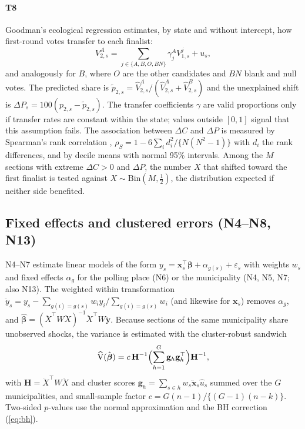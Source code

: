 \paragraph{T8} Goodman's ecological regression \cite{goodman1953}
estimates, by state and without intercept, how first-round votes transfer to
each finalist:
\begin{equation}
V^{A}_{2,s}=\sum_{j\in\{A,B,O,\mathit{BN}\}}\gamma^{A}_{j}V_{1,s}^{j}+u_s,
\label{eq:goodman}
\end{equation}
and analogously for $B$, where $O$ are the other candidates and
$\mathit{BN}$ blank and null votes. The predicted share is
$\tilde p_{2,s}=\hat V^A_{2,s}/(\hat V^A_{2,s}+\hat V^B_{2,s})$ and the
unexplained shift is $\Delta P_s=100(p_{2,s}-\tilde p_{2,s})$. The
transfer coefficients $\gamma$ are valid proportions only if transfer rates
are constant within the state; values outside $[0,1]$ signal that this
assumption fails. The association between $\Delta C$ and $\Delta P$ is
measured by Spearman's rank correlation \cite{spearman1904},
$\rho_S=1-6\sum_i d_i^2/\{N(N^2-1)\}$ with $d_i$ the rank differences, and by
decile means with normal 95\% intervals. Among the $M$ sections with extreme
$\Delta C>0$ and $\Delta P$, the number $X$ that shifted toward the first
finalist is tested against $X\sim\mathrm{Bin}(M,\tfrac12)$, the distribution
expected if neither side benefited.

\subsection{Fixed effects and clustered errors (N4--N8, N13)}

N4--N7 estimate linear models of the form $y_s=\mathbf x_s^\top\boldsymbol\beta+\alpha_{g(s)}+\varepsilon_s$
with weights $w_s$ and fixed effects $\alpha_g$ for the polling place (N6)
or the municipality (N4, N5, N7; also N13). The weighted within transformation
$\ddot y_s=y_s-\sum_{g(i)=g(s)}w_iy_i/\sum_{g(i)=g(s)}w_i$ (and likewise for
$\mathbf x_s$) removes $\alpha_g$, and
$\hat{\boldsymbol\beta}=(\ddot X^\top W\ddot X)^{-1}\ddot X^\top W\ddot{\mathbf y}$.
Because sections of the same municipality share unobserved shocks, the
variance is estimated with the cluster-robust sandwich \cite{cameron2015}
\begin{equation}
\widehat{\mathrm V}(\hat{\boldsymbol\beta})=c\,\mathbf H^{-1}
\Bigl(\sum_{h=1}^{G}\mathbf g_h\mathbf g_h^\top\Bigr)\mathbf H^{-1},
\label{eq:sandwich}
\end{equation}
with $\mathbf H=\ddot X^\top W\ddot X$ and cluster scores
$\mathbf g_h=\sum_{s\in h}w_s\ddot{\mathbf x}_s\hat u_s$ summed over the
$G$ municipalities, and small-sample factor
$c=G(n-1)/\{(G-1)(n-k)\}$. Two-sided $p$-values use the normal
approximation and the BH correction (\ref{eq:bh}).

